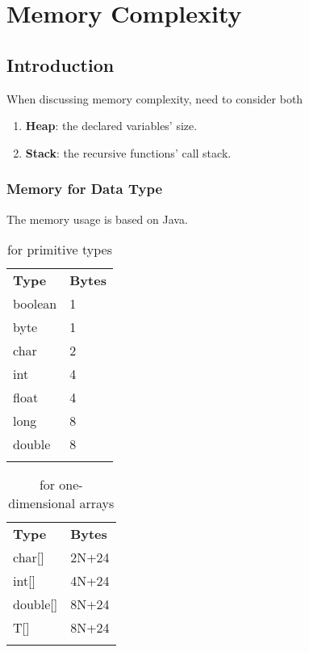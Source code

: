 \chapter{Memory Complexity}

\section{Introduction}
When discussing memory complexity, need to consider both 
\begin{enumerate}
\item \textbf{Heap}: the declared variables' size.
\item \textbf{Stack}: the recursive functions' call stack.
\end{enumerate}
\subsection{Memory for Data Type}
The memory usage is based on Java.\\

\begin{table}
\begin{tabular}{ll}
\hline\noalign{\smallskip}
\textbf{Type} & \textbf{Bytes} \\
\noalign{\smallskip}\hline\noalign{\smallskip}

boolean & 1 \\
byte & 1 \\
char & 2 \\
int & 4 \\
float & 4 \\
long & 8 \\
double & 8\\

\noalign{\smallskip}\hline\noalign{\smallskip}
\end{tabular}
\caption{for primitive types}
\end{table}

\begin{table}
\begin{tabular}{ll}
\hline\noalign{\smallskip}
\textbf{Type} & \textbf{Bytes} \\
\noalign{\smallskip}\hline\noalign{\smallskip}

char[] & 2N+24 \\
int[] & 4N+24 \\
double[] & 8N+24 \\
T[] & 8N+24 \\

\noalign{\smallskip}\hline\noalign{\smallskip}
\end{tabular}
\caption{for one-dimensional arrays}
\end{table}

